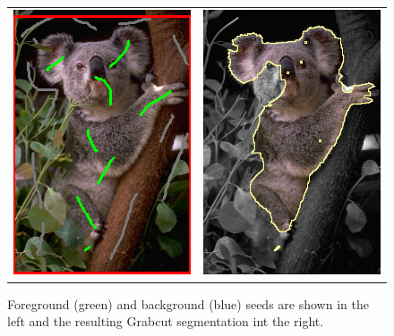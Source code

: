 \begin{figure}
\centering
\begin{tabular}{cc}
\includegraphics[scale=0.4]{figures/chapter9/segmentation/seeds.png} &
\includegraphics[scale=0.4]{figures/chapter9/segmentation/gc-seg.png}
\end{tabular}
\caption{Foreground (green) and background (blue) seeds are shown in the left and the resulting Grabcut segmentation int the right.}
\label{fig:grabcut-input-image-segmentation}
\end{figure}

